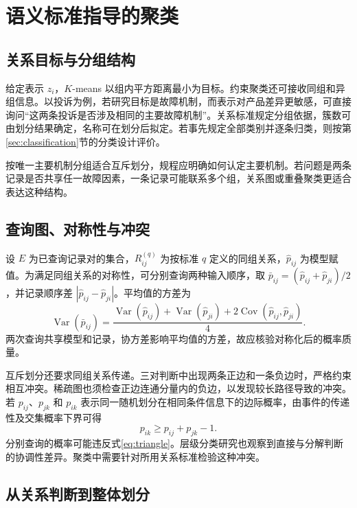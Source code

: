 \documentclass[UTF8,a4paper,zihao=-4,fontset=fandol]{ctexart}
\newcommand{\Var}{\operatorname{Var}}
\begin{document}
\section{语义标准指导的聚类}\label{sec:clustering}

\subsection{关系目标与分组结构}

给定表示 $z_i$，$K$-means 以组内平方距离最小为目标。约束聚类还可接收同组和异组信息\citep{wagstaff2001}。以投诉为例，若研究目标是故障机制，而表示对产品差异更敏感，可直接询问“这两条投诉是否涉及相同的主要故障机制”。关系标准规定分组依据，簇数可由划分结果确定，名称可在划分后拟定。若事先规定全部类别并逐条归类，则按第\ref{sec:classification}节的分类设计评价。

按唯一主要机制分组适合互斥划分，规程应明确如何认定主要机制。若问题是两条记录是否共享任一故障因素，一条记录可能联系多个组，关系图或重叠聚类更适合表达这种结构。

\subsection{查询图、对称性与冲突}

设 $E$ 为已查询记录对的集合，$R_{ij}^{(q)}$ 为按标准 $q$ 定义的同组关系，$\widehat p_{ij}$ 为模型赋值。为满足同组关系的对称性，可分别查询两种输入顺序，取 $\bar p_{ij}=(\widehat p_{ij}+\widehat p_{ji})/2$，并记录顺序差 $|\widehat p_{ij}-\widehat p_{ji}|$。平均值的方差为
\begin{equation}
 \Var(\bar p_{ij})=
 \frac{\Var(\widehat p_{ij})+\Var(\widehat p_{ji})
 +2\operatorname{Cov}(\widehat p_{ij},\widehat p_{ji})}{4}.
 \label{eq:symmetry}
\end{equation}
两次查询共享模型和记录，协方差影响平均值的方差，故应核验对称化后的概率质量。

互斥划分还要求同组关系传递。三对判断中出现两条正边和一条负边时，严格约束相互冲突。稀疏图也须检查正边连通分量内的负边，以发现较长路径导致的冲突。若 $p_{ij}$、$p_{jk}$ 和 $p_{ik}$ 表示同一随机划分在相同条件信息下的边际概率，由事件的传递性及交集概率下界可得
\begin{equation}
 p_{ik}\geq p_{ij}+p_{jk}-1.
 \label{eq:triangle}
\end{equation}
分别查询的概率可能违反式\eqref{eq:triangle}。层级分类研究也观察到直接与分解判断的协调性差异\citep{joy2026}。聚类中需要针对所用关系标准检验这种冲突。

\subsection{从关系判断到整体划分}
\end{document}
